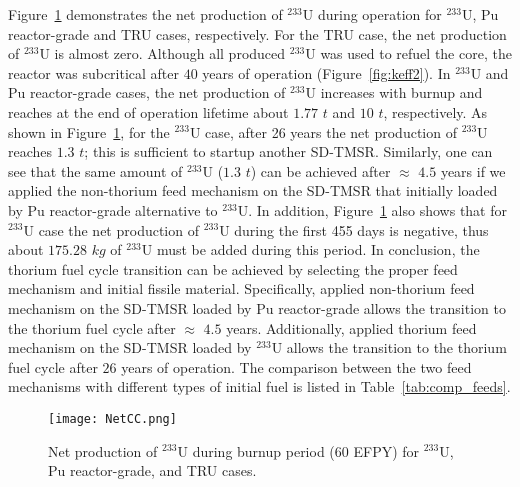 Figure~\ref{fig:NetCC} demonstrates the net production of $^{233}$U during 
operation for $^{233}$U, Pu reactor-grade and TRU cases, respectively. For the TRU case, the net production of $^{233}$U is almost 
zero. 
Although all produced $^{233}$U was used to refuel the core, the reactor was subcritical after $40$ years of operation (Figure~\ref{fig:keff2}).
In $^{233}$U and Pu reactor-grade cases, the net production of 
$^{233}$U increases with burnup and reaches at the end of operation lifetime 
about $1.77$ $t$ and $10$ $t$, respectively. As shown in 
Figure~\ref{fig:NetCC}, for the $^{233}$U case, after 26 years the net production of $^{233}$U reaches 
$1.3$ $t$; this is sufficient to startup another \gls{SD-TMSR}. Similarly, 
one can see that the same amount of $^{233}$U ($1.3$ $t$) can be achieved 
after $\approx$ $4.5$ years if we applied the non-thorium feed mechanism on 
the SD-TMSR that initially loaded by Pu reactor-grade alternative to 
$^{233}$U. In addition, Figure~\ref{fig:NetCC} also shows that for $^{233}$U 
case the net production of $^{233}$U during the first 455 days is negative, 
thus about $175.28$ $kg$ of $^{233}$U must be added during this period. 
In conclusion, the thorium fuel cycle transition can be achieved by selecting the 
proper feed mechanism and initial fissile material. 
Specifically, applied non-thorium feed mechanism on 
the SD-TMSR loaded by Pu reactor-grade allows the 
transition to the thorium fuel cycle after $\approx$ 
$4.5$ years. Additionally, applied thorium feed mechanism on 
the SD-TMSR loaded by $^{233}$U allows the 
transition to the thorium fuel cycle after $26$ years of operation. 
The comparison between the two feed mechanisms with different types of initial 
fuel is listed in Table~\ref{tab:comp_feeds}. 

\begin{figure}
	\centering
	\texttt{[image: NetCC.png]}
	\caption{Net production of $^{233}$U during burnup period (60 \gls{EFPY}) for $^{233}$U, Pu reactor-grade, and TRU cases.}
	\label{fig:NetCC}
\end{figure}

